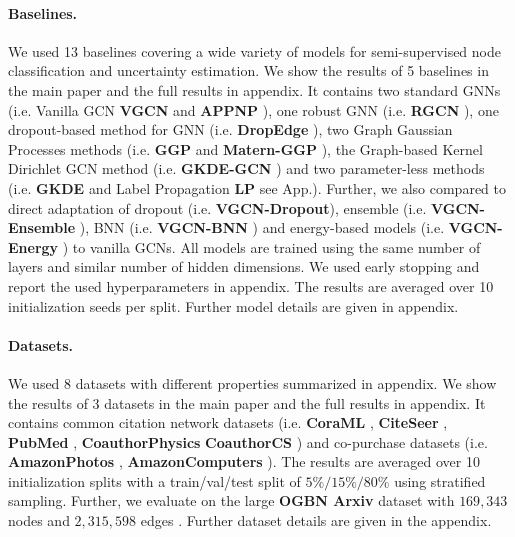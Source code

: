 \paragraph{Baselines.} We used 13 baselines covering a wide variety of models for semi-supervised node classification and uncertainty estimation. We show the results of 5 baselines in the main paper and the full results in appendix. It contains two standard GNNs (i.e. Vanilla GCN \textbf{VGCN} \citep{Kipf2016, Shchur2018} and \textbf{APPNP} \citep{Klicpera2018}), one robust GNN (i.e. \textbf{RGCN} \citep{Zhu2019}), one dropout-based method for GNN (i.e. \textbf{DropEdge} \citep{Rong2019}), two Graph Gaussian Processes methods (i.e. \textbf{GGP} \citep{Ng2018} and \textbf{Matern-GGP} \citep{Borovitskiy2020}), the Graph-based Kernel Dirichlet GCN method (i.e. \textbf{GKDE-GCN} \citep{Zhao2020}) and two parameter-less methods (i.e. \textbf{GKDE} \citep{Zhao2020} and Label Propagation \textbf{LP} see App.). Further, we also compared to direct adaptation of dropout (i.e. \textbf{VGCN-Dropout}\citep{dropout}), ensemble (i.e. \textbf{VGCN-Ensemble} \citep{ensembles}), BNN (i.e. \textbf{VGCN-BNN} \citep{bayesian-networks}) and energy-based models (i.e. \textbf{VGCN-Energy} \citep{Liu2020a}) to vanilla GCNs. All models are trained using the same number of layers and similar number of hidden dimensions. We used early stopping and report the used hyperparameters in appendix. The results are averaged over 10 initialization seeds per split. Further model details are given in appendix.

\paragraph{Datasets.} We used 8 datasets with different properties summarized in appendix. We show the results of 3 datasets in the main paper and the full results in appendix. It contains common citation network datasets (i.e. \textbf{CoraML} \citep{Mccallum2000, Giles1998, Getoor2005, Sen2008a}, \textbf{CiteSeer} \citep{Giles1998, Getoor2005, Sen2008a}, \textbf{PubMed} \citep{Namata2012}, \textbf{CoauthorPhysics} \citep{Shchur2018} \textbf{CoauthorCS} \citep{Shchur2018})
 and co-purchase datasets (i.e. \textbf{AmazonPhotos} \citep{Mcauley2015, Shchur2018}, \textbf{AmazonComputers} \citep{Mcauley2015, Shchur2018}). The results are averaged over 10 initialization splits with a train/val/test split of $5\%/15\%/80\%$ using stratified sampling. Further, we evaluate on the large \textbf{OGBN Arxiv} dataset with $169,343$ nodes and $2,315,598$ edges \citep{ogb-dataset, microsoft-academic-graph}. Further dataset details are given in the appendix.
 
